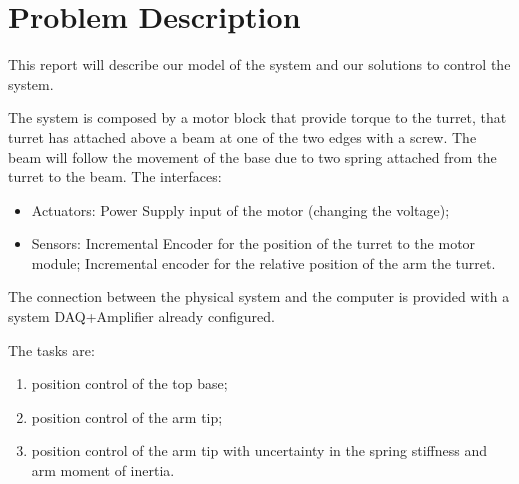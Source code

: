 \chapter{Problem Description}
\label{cha:problem_description}

    This report will describe our model of the system and our solutions to control the system.

    The system is composed by a motor block that provide torque to the turret, that turret has attached above a beam at one of the two edges with a screw. The beam will follow the movement of the base due to two spring attached from the turret to the beam.
    The interfaces:
    \begin{itemize}
        \item Actuators:
            \subitem Power Supply input of the motor (changing the voltage);
        \item Sensors:
            \subitem Incremental Encoder for the position of the turret \wrt to the motor module;
            \subitem Incremental encoder for the relative position of the arm \wrt the turret.
    \end{itemize}
    The connection between the physical system and the computer is provided with a system DAQ+Amplifier already configured.

    The tasks are:
    \begin{enumerate}
        \item position control of the top base;
        \item position control of the arm tip;
        \item position control of the arm tip with uncertainty in the spring stiffness and arm moment of inertia.
    \end{enumerate}






